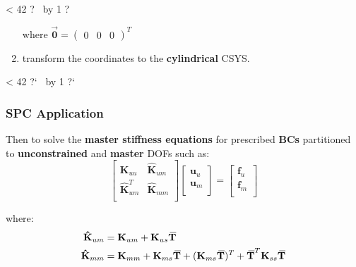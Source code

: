 \documentclass[10pt,b5paper,titlepage]{book}
\newcommand{\m}{\mathbf}
\newcommand{\closure}[2][3]{%
{}\mkern#1mu\overline{\mkern-#1mu#2}}
\newcommand{\repeatit}[3][10]{%
    \myloopcounter1%
    \loop\ifnum\myloopcounter < #1
    #2#3%
    \advance\myloopcounter by 1%
    \repeat%
    #2%
}
\newenvironment{qbox}
{
\begin{center}
    \repeatit[42]{?}{\ }
\end{center}
}
{
\begin{center}
    \repeatit[42]{?`}{\ }
\end{center}
}
\newenvironment{eqarray}
{
    \begin{eqnarray}
        \begin{aligned}
}
{
        \end{aligned}
    \end{eqnarray}
}
\begin{document}
\begin{qbox}
\begin{enumerate}
             where $ \vec{\m{0}} = \begin{pmatrix} 0 & 0 & 0 \end{pmatrix}^T $

        \item transform the coordinates to the \textbf{cylindrical} CSYS.

    \end{enumerate}

\end{qbox}



\subsubsection{SPC Application}

Then to solve the \textbf{master stiffness equations} for prescribed \textbf{BCs}
partitioned to \textbf{unconstrained} and \textbf{master} DOFs such as:
\begin{equation}
    \begin{bmatrix}
        \m{K}_{uu} & \m{\hat{K}}_{um} \\
        \m{\hat{K}}_{um}^T & \m{\hat{K}}_{mm} \\
    \end{bmatrix}
    \begin{bmatrix}
        \m{u}_u \\
        \m{u}_m \\
    \end{bmatrix}
    = \begin{bmatrix}
        \m{f}_{u} \\
        \m{f}_m \\
    \end{bmatrix}
\end{equation}

where:
\begin{eqarray}
    \m{\hat{K}}_{um} &= \m{K}_{um} + \m{K}_{us} \m{\closure{T}} \\
    \m{\hat{K}}_{mm} &= \m{K}_{mm} + \m{K}_{ms} \m{\closure{T}}
                      + (\m{K}_{ms} \m{\closure{T}})^T
                      + \m{\closure{T}}^T \m{K}_{ss} \m{\closure{T}}
\end{eqarray}
\end{document}
